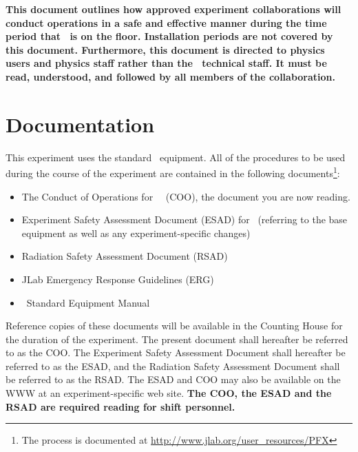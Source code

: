 \documentclass[10pt]{article}
\begin{document}
{\bf This document outlines how approved experiment collaborations will conduct
operations in a safe and effective manner during the time period that 
\EXPTS\  is on the floor. Installation 
periods are not covered by this document. 
Furthermore, this document is directed to physics users and
physics staff rather than the \HALL\ technical staff.  It must be read, 
understood, and followed by all members of the collaboration. }

\section{Documentation}

This experiment uses the standard \HALL\ equipment. 
All of the procedures to be used during the course of the experiment are contained in the following
documents\footnote{The process is documented at \url{http://www.jlab.org/user_resources/PFX} }:

\begin{itemize}

\item  The Conduct of Operations for \HALL\ \EXPTS\
 (COO), the document you are now reading. 

\item   Experiment Safety Assessment Document (ESAD)
for \EXPTS\ (referring to the base equipment as well as any 
experiment-specific changes)

\item Radiation Safety Assessment Document (RSAD) 

\item JLab Emergency Response Guidelines (ERG) 

\item \HALL\ Standard Equipment Manual 

\end{itemize}


Reference copies of these documents will be available in the Counting 
House for the duration of the experiment. The present document shall 
hereafter be referred to as the COO. The Experiment Safety Assessment 
Document shall hereafter be referred to as the ESAD, and the
Radiation Safety Assessment Document shall be referred to as the RSAD.
The ESAD and COO may also be available on the WWW at an experiment-specific 
web site. {\bf The COO, the ESAD and the RSAD are required reading for 
shift personnel.}
\end{document}
